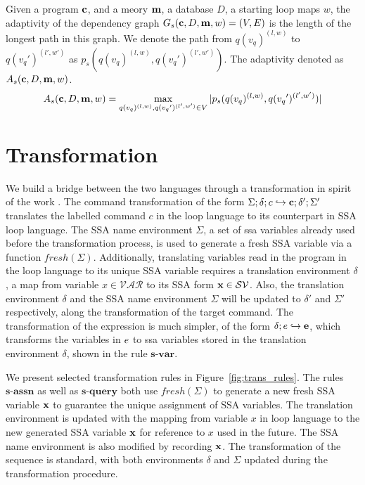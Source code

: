 \begin{defn}
Given a program ${\bf{{c}}}$, and a meory ${\bf{{m}}}$, a database $D$, a starting loop maps $w$, the adaptivity of the dependency graph $G_s({\bf{{c}}}, D,{\bf{{m}}},w) = (V, E)$ is the length of the longest path in this graph. We denote the path from $q({v_q})^{(l,w)}$ to $q({v_q}')^{(l',w')}$ as $p_s(q({v_q})^{(l,w)}, q({v_q}')^{(l',w')} )$. The adaptivity denoted as $A_s({\bf{{c}}}, D, {\bf{{m}}}, w)$.
%
$$A_s({\bf{{c}}}, D, {\bf{{m}}}, w) = \max\limits_{q({v_q})^{(l,w)},q({v_q}')^{(l',w')} \in V } |p_s(q({v_q})^{(l,w)}, q({v_q}')^{(l',w')} )| $$
\end{defn}



\section{Transformation }
\label{sec:adapt-transformation}
We build a bridge between the two languages through a transformation in spirit of the work \cite{VekrisCJ16}. The command transformation of the form $ \Sigma; \delta ; c  \hookrightarrow {\bf{{c}}} ; \delta' ; \Sigma'$ translates the labelled command $c$ in the {loop} language to its counterpart in SSA loop language.  The SSA name environment $\Sigma$, a set of ssa variables already used before the transformation process, is used to generate a fresh SSA variable via a function $fresh(\Sigma)$. Additionally, translating variables read in the program in the {loop} language to its unique SSA variable requires a translation environment $\delta$, a map from variable $x \in \mathcal{VAR}$ to its SSA form ${\bf{{x}}} \in \mathcal{SV}$. Also, the translation environment $\delta$ and the SSA name environment $\Sigma$ will be updated to $\delta'$ and $\Sigma'$ respectively, along the transformation of the target command. The transformation of the expression is much simpler, of the form $ \delta; e \hookrightarrow {\bf{{e}}}$, which transforms the variables in $e$ to ssa variables stored in the translation environment $\delta$, shown in the rule $\textbf{s-var}$.

We present selected transformation rules in Figure~\ref{fig:trans_rules}. The rules $\textbf{s-assn}$ as well as $\textbf{s-query}$ both use $fresh(\Sigma)$ to generate a new fresh SSA variable ${\bf{{x}}}$ to guarantee the unique assignment of SSA variables. The translation environment is updated with the mapping from variable $x$ in {loop} language to the new generated SSA variable ${\bf{{x}}}$ for reference to $x$ used in the future. The SSA name environment is also modified by recording ${\bf{{x}}}$. The transformation of the sequence is standard, with both environments $\delta$ and $\Sigma$ updated during the transformation procedure.   

